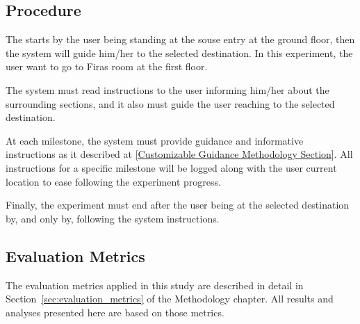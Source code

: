 \subsection{Procedure}
The starts by the user being standing at the souse entry at the ground floor, then the system will guide him/her to the selected destination. In this experiment, the user want to go to Firas room at the first floor.

The system must read instructions to the user informing him/her about the surrounding sections, and it also must guide the user reaching to the selected destination.

At each milestone, the system must provide guidance and informative instructions as it described at \ref{Customizable Guidance Methodology Section}. All instructions for a specific milestone will be logged along with the user current location to ease following the experiment progress.

Finally, the experiment must end after the user being at the selected destination by, and only by, following the system instructions.

\subsection{Evaluation Metrics}
The evaluation metrics applied in this study are described in detail in Section~\ref{sec:evaluation_metrics} of the Methodology chapter. All results and analyses presented here are based on those metrics.


